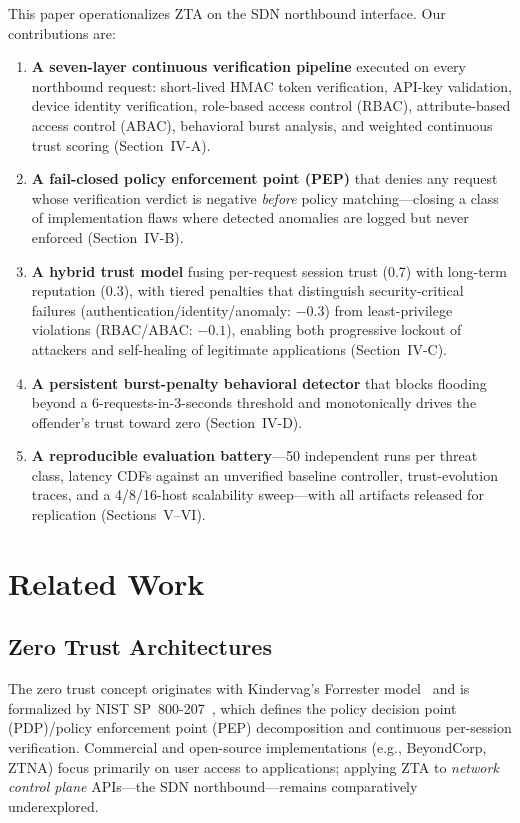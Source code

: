 \documentclass[journal]{IEEEtran}
\begin{document}
This paper operationalizes ZTA on the SDN northbound interface. Our contributions are:
\begin{enumerate}
\item \textbf{A seven-layer continuous verification pipeline} executed on every northbound request: short-lived HMAC token verification, API-key validation, device identity verification, role-based access control (RBAC), attribute-based access control (ABAC), behavioral burst analysis, and weighted continuous trust scoring (Section~IV-A).
\item \textbf{A fail-closed policy enforcement point (PEP)} that denies any request whose verification verdict is negative \emph{before} policy matching---closing a class of implementation flaws where detected anomalies are logged but never enforced (Section~IV-B).
\item \textbf{A hybrid trust model} fusing per-request session trust (0.7) with long-term reputation (0.3), with tiered penalties that distinguish security-critical failures (authentication/identity/anomaly: $-0.3$) from least-privilege violations (RBAC/ABAC: $-0.1$), enabling both progressive lockout of attackers and self-healing of legitimate applications (Section~IV-C).
\item \textbf{A persistent burst-penalty behavioral detector} that blocks flooding beyond a 6-requests-in-3-seconds threshold and monotonically drives the offender's trust toward zero (Section~IV-D).
\item \textbf{A reproducible evaluation battery}---50 independent runs per threat class, latency CDFs against an unverified baseline controller, trust-evolution traces, and a 4/8/16-host scalability sweep---with all artifacts released for replication (Sections~V--VI).
\end{enumerate}

\section{Related Work}
\subsection{Zero Trust Architectures}
The zero trust concept originates with Kindervag's Forrester model~\cite{kindervag} and is formalized by NIST SP~800-207~\cite{nist}, which defines the policy decision point (PDP)/policy enforcement point (PEP) decomposition and continuous per-session verification. Commercial and open-source implementations (e.g., BeyondCorp, ZTNA) focus primarily on user access to applications; applying ZTA to \emph{network control plane} APIs---the SDN northbound---remains comparatively underexplored.
\end{document}

